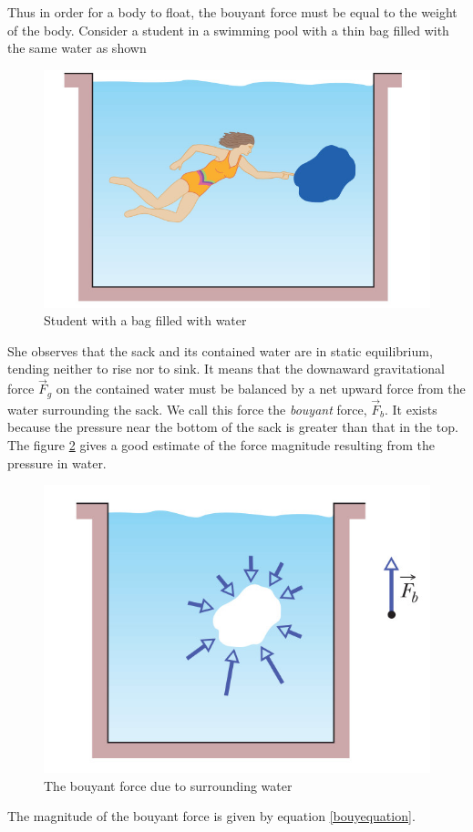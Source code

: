 \documentclass[10pt]{article}
\begin{document}
Thus in order for a body to float, the bouyant force must be equal to the weight of the body.  Consider a student in a swimming pool with a thin bag filled with the same water as shown 
\begin{figure}[h]
\label{studentswimmer}
\includegraphics[scale=.7]{studentswimmer}
\centering
\caption{Student with a bag filled with water}
\centering
\end{figure}
She observes that the sack and its contained water are in static equilibrium, tending neither to rise nor to sink.  It means that the downaward gravitational force $\vec{F}_g$ on the contained water must be balanced by a net upward force from the water surrounding the sack.  We call this force the \emph{bouyant} force, $\vec{F}_b$.  It exists because the pressure near the bottom of the sack is greater than that in the top.  The figure \ref{bouymagforce} gives a good estimate of the force magnitude resulting from the pressure in water.
\begin{figure}[h]
\includegraphics[scale=.7]{forcemagbouy}
\centering
\caption{The bouyant force due to surrounding water}
\label{bouymagforce}
\centering
\end{figure}
The magnitude of the bouyant force is given by equation \ref{bouyequation}.
\end{document}
